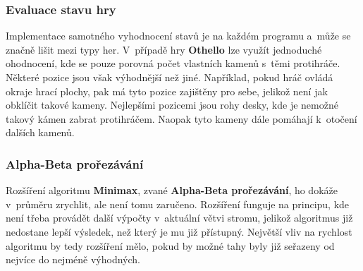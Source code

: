 \subsubsection{Evaluace stavu hry}

Implementace samotného vyhodnocení stavů je na každém programu a~může se značně lišit mezi typy her. V~případě hry \textbf{Othello} lze využít jednoduché ohodnocení, kde se pouze porovná počet vlastních kamenů s~těmi protihráče. Některé pozice jsou však výhodnější než jiné. Například, pokud hráč ovládá okraje hrací plochy, pak má tyto pozice zajištěny pro sebe, jelikož není jak obklíčit takové kameny. Nejlepšími pozicemi jsou rohy desky, kde je nemožné takový kámen zabrat protihráčem. Naopak tyto kameny dále pomáhají k~otočení dalších kamenů.

\subsubsection{Alpha-Beta prořezávání}

Rozšíření algoritmu \textbf{Minimax}, zvané \textbf{Alpha-Beta prořezávání}, ho dokáže v~průměru zrychlit, ale není tomu zaručeno. Rozšíření funguje na principu, kde není třeba provádět další výpočty v~aktuální větvi stromu, jelikož algoritmus již nedostane lepší výsledek, než který je mu již přístupný. Největší vliv na rychlost algoritmu by tedy rozšíření mělo, pokud by možné tahy byly již seřazeny od nejvíce do nejméně výhodných.
